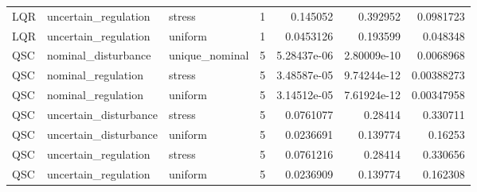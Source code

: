 \begin{tabular}{llllrrr}
LQR & uncertain\_regulation & stress & 1 & 0.145052 & 0.392952 & 0.0981723 \\
LQR & uncertain\_regulation & uniform & 1 & 0.0453126 & 0.193599 & 0.048348 \\
QSC & nominal\_disturbance & unique\_nominal & 5 & 5.28437e-06 & 2.80009e-10 & 0.0068968 \\
QSC & nominal\_regulation & stress & 5 & 3.48587e-05 & 9.74244e-12 & 0.00388273 \\
QSC & nominal\_regulation & uniform & 5 & 3.14512e-05 & 7.61924e-12 & 0.00347958 \\
QSC & uncertain\_disturbance & stress & 5 & 0.0761077 & 0.28414 & 0.330711 \\
QSC & uncertain\_disturbance & uniform & 5 & 0.0236691 & 0.139774 & 0.16253 \\
QSC & uncertain\_regulation & stress & 5 & 0.0761216 & 0.28414 & 0.330656 \\
QSC & uncertain\_regulation & uniform & 5 & 0.0236909 & 0.139774 & 0.162308 \\
\hline
\end{tabular}
